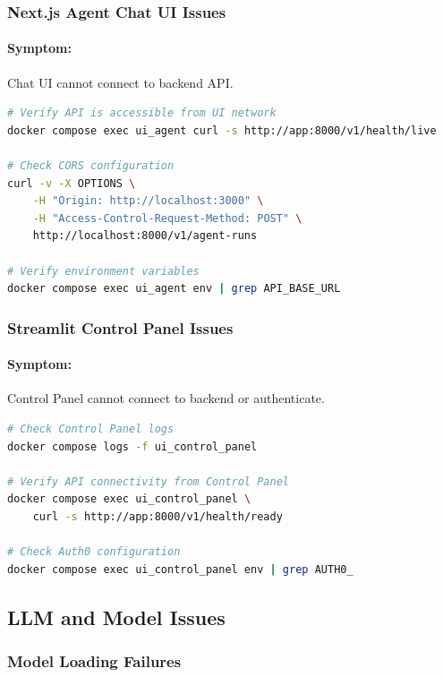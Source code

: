 \subsubsection{Next.js Agent Chat UI Issues}

\paragraph{Symptom:} Chat UI cannot connect to backend API.

\begin{lstlisting}[language=bash, caption=Diagnosing Agent Chat UI issues]
# Verify API is accessible from UI network
docker compose exec ui_agent curl -s http://app:8000/v1/health/live

# Check CORS configuration
curl -v -X OPTIONS \
    -H "Origin: http://localhost:3000" \
    -H "Access-Control-Request-Method: POST" \
    http://localhost:8000/v1/agent-runs

# Verify environment variables
docker compose exec ui_agent env | grep API_BASE_URL
\end{lstlisting}

\subsubsection{Streamlit Control Panel Issues}

\paragraph{Symptom:} Control Panel cannot connect to backend or authenticate.

\begin{lstlisting}[language=bash, caption=Diagnosing Control Panel issues]
# Check Control Panel logs
docker compose logs -f ui_control_panel

# Verify API connectivity from Control Panel
docker compose exec ui_control_panel \
    curl -s http://app:8000/v1/health/ready

# Check Auth0 configuration
docker compose exec ui_control_panel env | grep AUTH0_
\end{lstlisting}

\subsection{LLM and Model Issues}

\subsubsection{Model Loading Failures}

